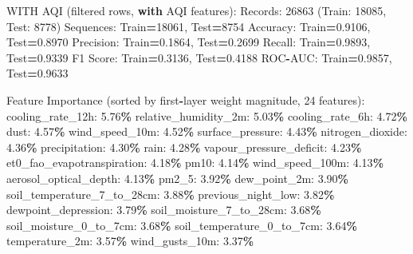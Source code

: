 \documentclass[
  letterpaper,
  DIV=11,
  numbers=noendperiod]{scrartcl}
\newenvironment{Shaded}{\begin{snugshade}}{\end{snugshade}}
\newcommand{\BuiltInTok}[1]{#1}
\newcommand{\ControlFlowTok}[1]{\textcolor[rgb]{0.13,0.29,0.53}{\textbf{#1}}}
\newcommand{\DecValTok}[1]{\textcolor[rgb]{0.00,0.00,0.81}{#1}}
\newcommand{\FloatTok}[1]{\textcolor[rgb]{0.00,0.00,0.81}{#1}}
\newcommand{\NormalTok}[1]{#1}
\newcommand{\OperatorTok}[1]{\textcolor[rgb]{0.81,0.36,0.00}{\textbf{#1}}}
\begin{document}
\begin{Shaded}
\begin{Highlighting}[]
\NormalTok{WITH AQI (filtered rows, }\ControlFlowTok{with}\NormalTok{ AQI features):}
\NormalTok{  Records: }\DecValTok{26863}\NormalTok{ (Train: }\DecValTok{18085}\NormalTok{, Test: }\DecValTok{8778}\NormalTok{)}
\NormalTok{  Sequences: Train}\OperatorTok{=}\DecValTok{18061}\NormalTok{, Test}\OperatorTok{=}\DecValTok{8754}
\NormalTok{  Accuracy: Train}\OperatorTok{=}\FloatTok{0.9106}\NormalTok{, Test}\OperatorTok{=}\FloatTok{0.8970}
\NormalTok{  Precision: Train}\OperatorTok{=}\FloatTok{0.1864}\NormalTok{, Test}\OperatorTok{=}\FloatTok{0.2699}
\NormalTok{  Recall: Train}\OperatorTok{=}\FloatTok{0.9893}\NormalTok{, Test}\OperatorTok{=}\FloatTok{0.9339}
\NormalTok{  F1 Score: Train}\OperatorTok{=}\FloatTok{0.3136}\NormalTok{, Test}\OperatorTok{=}\FloatTok{0.4188}
\NormalTok{  ROC}\OperatorTok{{-}}\NormalTok{AUC: Train}\OperatorTok{=}\FloatTok{0.9857}\NormalTok{, Test}\OperatorTok{=}\FloatTok{0.9633}

\NormalTok{  Feature Importance (}\BuiltInTok{sorted}\NormalTok{ by first}\OperatorTok{{-}}\NormalTok{layer weight magnitude, }\DecValTok{24}\NormalTok{ features):}
\NormalTok{    cooling\_rate\_12h: }\FloatTok{5.76}\OperatorTok{\%}
\NormalTok{    relative\_humidity\_2m: }\FloatTok{5.03}\OperatorTok{\%}
\NormalTok{    cooling\_rate\_6h: }\FloatTok{4.72}\OperatorTok{\%}
\NormalTok{    dust: }\FloatTok{4.57}\OperatorTok{\%}
\NormalTok{    wind\_speed\_10m: }\FloatTok{4.52}\OperatorTok{\%}
\NormalTok{    surface\_pressure: }\FloatTok{4.43}\OperatorTok{\%}
\NormalTok{    nitrogen\_dioxide: }\FloatTok{4.36}\OperatorTok{\%}
\NormalTok{    precipitation: }\FloatTok{4.30}\OperatorTok{\%}
\NormalTok{    rain: }\FloatTok{4.28}\OperatorTok{\%}
\NormalTok{    vapour\_pressure\_deficit: }\FloatTok{4.23}\OperatorTok{\%}
\NormalTok{    et0\_fao\_evapotranspiration: }\FloatTok{4.18}\OperatorTok{\%}
\NormalTok{    pm10: }\FloatTok{4.14}\OperatorTok{\%}
\NormalTok{    wind\_speed\_100m: }\FloatTok{4.13}\OperatorTok{\%}
\NormalTok{    aerosol\_optical\_depth: }\FloatTok{4.13}\OperatorTok{\%}
\NormalTok{    pm2\_5: }\FloatTok{3.92}\OperatorTok{\%}
\NormalTok{    dew\_point\_2m: }\FloatTok{3.90}\OperatorTok{\%}
\NormalTok{    soil\_temperature\_7\_to\_28cm: }\FloatTok{3.88}\OperatorTok{\%}
\NormalTok{    previous\_night\_low: }\FloatTok{3.82}\OperatorTok{\%}
\NormalTok{    dewpoint\_depression: }\FloatTok{3.79}\OperatorTok{\%}
\NormalTok{    soil\_moisture\_7\_to\_28cm: }\FloatTok{3.68}\OperatorTok{\%}
\NormalTok{    soil\_moisture\_0\_to\_7cm: }\FloatTok{3.68}\OperatorTok{\%}
\NormalTok{    soil\_temperature\_0\_to\_7cm: }\FloatTok{3.64}\OperatorTok{\%}
\NormalTok{    temperature\_2m: }\FloatTok{3.57}\OperatorTok{\%}
\NormalTok{    wind\_gusts\_10m: }\FloatTok{3.37}\OperatorTok{\%}


\end{Highlighting}
\end{Shaded}
\end{document}
